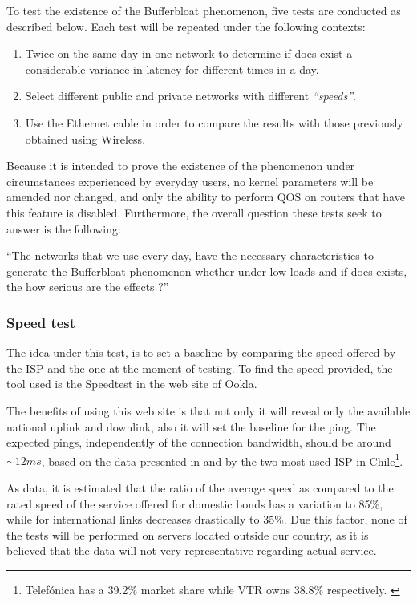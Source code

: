 To test the existence of the Bufferbloat phenomenon, five tests are conducted 
as described below. Each test will be repeated under the following contexts:

\begin{enumerate}
\item Twice on the same day in one network to determine if does exist a 
considerable variance in latency for different times in a day.
\item Select different public and private networks with different 
\textit{``speeds''}.
\item Use the Ethernet cable in order to compare the results with those 
previously obtained using Wireless.
\end{enumerate}

Because it is intended to prove the existence of the phenomenon under
circumstances experienced by everyday users, no kernel parameters will be
amended nor changed, and only the  ability to perform QOS on routers that have
this feature is disabled.  Furthermore, the overall question these tests seek
to answer is the following:

\begin{theoremnon}[] 
``The networks that we use every day, have the necessary characteristics to
generate the  Bufferbloat phenomenon whether under low loads and if does
exists, the how  serious are the effects ?''
\end{theoremnon}

\subsubsection{Speed test} 
The idea under this test, is to set a baseline by comparing the speed offered 
by the ISP and the one at the moment of testing. To find the speed provided, 
the  tool used is the Speedtest in the web site of Ookla.

The benefits of using this web site is that not only it will reveal only
the available national uplink and downlink, also it will set the baseline
for the ping. The expected pings, independently of the connection bandwidth,
should be around $\sim12ms$, based on the data presented in \cite{netvtr} and
\cite{netmov} by the two most used ISP in Chile\footnote{Telef\'onica has a
39.2\% market share while VTR owns 38.8\% respectively. \cite{ispshares}}.

As data, it is estimated that the ratio of the average speed as compared to the
rated speed of the service offered for domestic bonds has a variation to 85\%,
while for international links decreases drastically to 35\%\cite{modcompqos}.
Due this factor, none of the tests will be performed on servers located outside
our country, as it is believed that the data will not very representative
regarding actual service.

